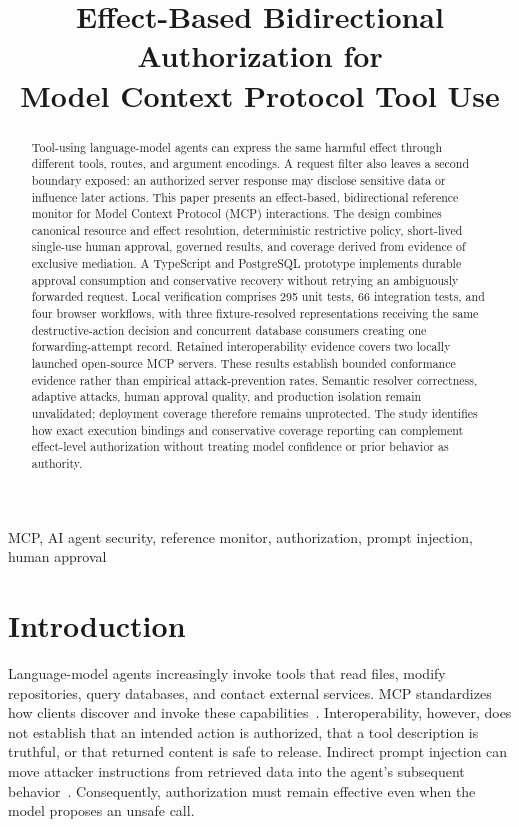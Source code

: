 \documentclass[conference,letterpaper]{IEEEtran}
\title{Effect-Based Bidirectional Authorization for\protect\\Model Context Protocol Tool Use}
\author{\IEEEauthorblockN{\rule{0pt}{12pt}\hspace{2.7in}}
\IEEEauthorblockA{\rule{0pt}{11pt}\hspace{2.7in}\\
\rule{0pt}{11pt}\hspace{2.7in}\\
\rule{0pt}{11pt}\hspace{2.7in}}}
\begin{document}
\maketitle

\begin{abstract}
Tool-using language-model agents can express the same harmful effect through different tools, routes, and argument encodings. A request filter also leaves a second boundary exposed: an authorized server response may disclose sensitive data or influence later actions. This paper presents an effect-based, bidirectional reference monitor for Model Context Protocol (MCP) interactions. The design combines canonical resource and effect resolution, deterministic restrictive policy, short-lived single-use human approval, governed results, and coverage derived from evidence of exclusive mediation. A TypeScript and PostgreSQL prototype implements durable approval consumption and conservative recovery without retrying an ambiguously forwarded request. Local verification comprises 295 unit tests, 66 integration tests, and four browser workflows, with three fixture-resolved representations receiving the same destructive-action decision and concurrent database consumers creating one forwarding-attempt record. Retained interoperability evidence covers two locally launched open-source MCP servers. These results establish bounded conformance evidence rather than empirical attack-prevention rates. Semantic resolver correctness, adaptive attacks, human approval quality, and production isolation remain unvalidated; deployment coverage therefore remains unprotected. The study identifies how exact execution bindings and conservative coverage reporting can complement effect-level authorization without treating model confidence or prior behavior as authority.
\end{abstract}
\begin{IEEEkeywords}
MCP, AI agent security, reference monitor, authorization, prompt injection, human approval
\end{IEEEkeywords}

\section{Introduction}
Language-model agents increasingly invoke tools that read files, modify repositories, query databases, and contact external services. MCP standardizes how clients discover and invoke these capabilities~\cite{mcp2025}. Interoperability, however, does not establish that an intended action is authorized, that a tool description is truthful, or that returned content is safe to release. Indirect prompt injection can move attacker instructions from retrieved data into the agent's subsequent behavior~\cite{greshake2023}. Consequently, authorization must remain effective even when the model proposes an unsafe call.
\end{document}

